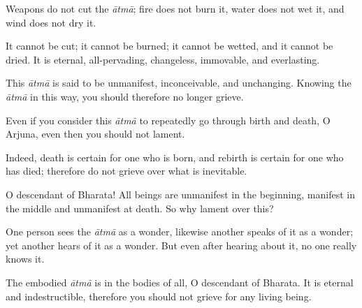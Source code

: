 {Weapons do not cut the \textit{ātmā}; fire does not burn it, water does not wet it, and wind does not dry it.}

{It cannot be cut; it cannot be burned; it cannot be wetted, and it cannot be dried. It is eternal, all-pervading, changeless, immovable, and everlasting.}

{This \textit{ātmā} is said to be unmanifest, inconceivable, and unchanging. Knowing the \textit{ātmā} in this way, you should therefore no longer grieve.}

{Even if you consider this \textit{ātmā} to repeatedly go through birth and death, O Arjuna, even then you should not lament.}

{Indeed, death is certain for one who is born, and rebirth is certain for one who has died; therefore do not grieve over what is inevitable.}

{O descendant of Bharata! All beings are unmanifest in the beginning, manifest in the middle and unmanifest at death. So why lament over this?}

{One person sees the \textit{ātmā} as a wonder, likewise another speaks of it as a wonder; yet another hears of it as a wonder. But even after hearing about it, no one really knows it.}

{The embodied \textit{ātmā} is in the bodies of all, O descendant of Bharata. It is eternal and indestructible, therefore you should not grieve for any living being.}

